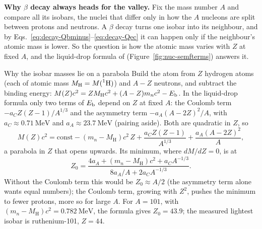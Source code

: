\begin{figure}[htbp]
\centering
{}
\end{figure}

\textbf{Why $\beta$ decay always heads for the valley.} Fix the mass number $A$ and compare all its
isobars, the nuclei that differ only in how the $A$ nucleons are split between protons and neutrons. A
$\beta$ decay turns one isobar into its neighbour, and by Eqs.~\eqref{eq:decay-Qbminus}--\eqref{eq:decay-Qec}
it can happen only if the neighbour's atomic mass is lower. So the question is how the atomic mass varies
with $Z$ at fixed $A$, and the liquid-drop formula of  (Figure~\ref{fig:nuc-semfterms}) answers it.

\begin{derivbox}{Why the isobar masses lie on a parabola}
Build the atom from $Z$ hydrogen atoms (each of atomic mass $M_{\mathrm{H}}=M(\prescript{1}{}{\mathrm{H}})$) and $A-Z$ neutrons, and subtract the binding energy:
$M(Z)c^2=ZM_{\mathrm{H}}c^2+(A-Z)m_nc^2-E_{\mathrm{b}}$. In the liquid-drop formula only two terms of $E_{\mathrm{b}}$ depend
on $Z$ at fixed $A$: the Coulomb term $-a_CZ(Z-1)/A^{1/3}$ and the asymmetry term $-a_A(A-2Z)^2/A$, with
$a_C\approx\SI{0.71}{\MeV}$ and $a_A\approx\SI{23.7}{\MeV}$ (pairing aside). Both are quadratic in $Z$, so
\[
M(Z)c^2=\text{const}-(m_n-M_{\mathrm{H}})c^2\,Z+\frac{a_CZ(Z-1)}{A^{1/3}}+\frac{a_A(A-2Z)^2}{A},
\]
a parabola in $Z$ that opens upwards. Its minimum, where $dM/dZ=0$, is at
\[
Z_0=\frac{4a_A+(m_n-M_{\mathrm{H}})c^2+a_CA^{-1/3}}{8a_A/A+2a_CA^{-1/3}} .
\]
Without the Coulomb term this would be $Z_0\approx A/2$ (the asymmetry term alone wants equal numbers);
the Coulomb term, growing with $Z^2$, pushes the minimum to fewer protons, more so for large $A$. For
$A=101$, with $(m_n-M_{\mathrm{H}})c^2=\SI{0.782}{\MeV}$, the formula gives $Z_0=43.9$; the measured lightest
isobar is ruthenium-101, $Z=44$.
\end{derivbox}

